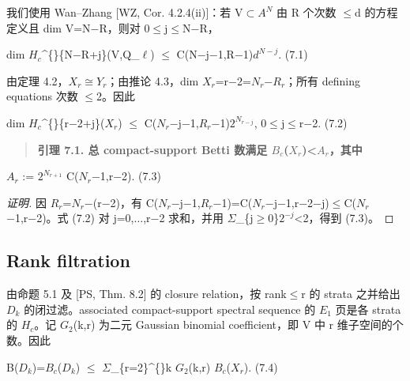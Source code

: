 \documentclass[11pt]{ctexart}
\begin{document}
我们使用 Wan–Zhang [WZ, Cor. 4.2.4(ii)]：若 V\ensuremath{\subset}\ensuremath{A^{N}} 由 R 个次数 \ensuremath{\le}d 的方程定义且 dim V=N−R，则对 0\ensuremath{\le}j\ensuremath{\le}N−R，

dim \ensuremath{H_{c}}\textasciicircum\{\}\{N−R+j\}(V,Q\_\ensuremath{\ell}) \ensuremath{\le} C(N−j−1,R−1)\ensuremath{d^{N−j}}.    (7.1)

由定理 4.2，\ensuremath{X_{r}}\ensuremath{\cong}\ensuremath{Y_{r}}；由推论 4.3，dim \ensuremath{X_{r}}=r−2=\ensuremath{N_{r}}−\ensuremath{R_{r}}；所有 defining equations 次数 \ensuremath{\le}2。因此

dim \ensuremath{H_{c}}\textasciicircum\{\}\{r−2+j\}(\ensuremath{X_{r}}) \ensuremath{\le} C(\ensuremath{N_{r}}−j−1,\ensuremath{R_{r}}−1)\ensuremath{2^{N_{r−j}}},  0\ensuremath{\le}j\ensuremath{\le}r−2.    (7.2)

\begin{quote}\textbf{引理 7.1. 总 compact-support Betti 数满足 \ensuremath{B_{c}}(\ensuremath{X_{r}})<\ensuremath{A_{r}}，其中}\end{quote}

\ensuremath{A_{r}} := \ensuremath{2^{N_{r+1}}} C(\ensuremath{N_{r}}−1,r−2).    (7.3)

\begin{proof}[证明] 

因 \ensuremath{R_{r}}=\ensuremath{N_{r}}−(r−2)，有 C(\ensuremath{N_{r}}−j−1,\ensuremath{R_{r}}−1)=C(\ensuremath{N_{r}}−j−1,r−2−j)\ensuremath{\le}C(\ensuremath{N_{r}}−1,r−2)。式 (7.2) 对 j=0,\ensuremath{\ldots},r−2 求和，并用 \ensuremath{\Sigma}\_\{j\ensuremath{\ge}0\}\ensuremath{2^{−j}}<2，得到 (7.3)。

\end{proof}

\subsection{Rank filtration}

由命题 5.1 及 [PS, Thm. 8.2] 的 closure relation，按 rank\ensuremath{\le}r 的 strata 之并给出 \ensuremath{D_{k}} 的闭过滤。associated compact-support spectral sequence 的 \ensuremath{E_1} 页是各 strata 的 \ensuremath{H_{c}}。记 \ensuremath{G_2}(k,r) 为二元 Gaussian binomial coefficient，即 V 中 r 维子空间的个数。因此

B(\ensuremath{D_{k}})=\ensuremath{B_{c}}(\ensuremath{D_{k}}) \ensuremath{\le} \ensuremath{\Sigma}\_\{r=2\}\textasciicircum\{\}k \ensuremath{G_2}(k,r) \ensuremath{B_{c}}(\ensuremath{X_{r}}).    (7.4)
\end{document}
